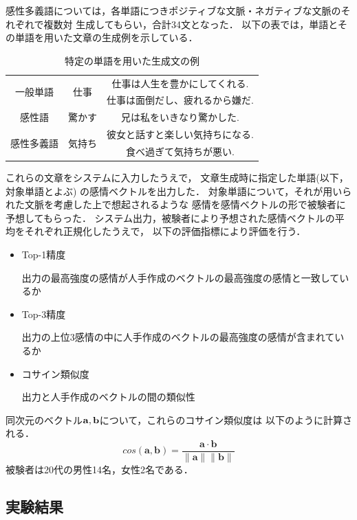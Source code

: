 		感性多義語については，各単語につきポジティブな文脈・ネガティブな文脈のそれぞれで複数対
		生成してもらい，合計34文となった．
		以下の表では，単語とその単語を用いた文章の生成例を示している．
		\begin{table}[H]
			\centering
			\caption{特定の単語を用いた生成文の例}
			\label{table:generated_sentences_sample}
			\begin{tabular}{|c|c|c|}
				\hline
				\multirow{2}{*}{一般単語} & \multirow{2}{*}{仕事} & 仕事は人生を豊かにしてくれる. \\
				\cline{3-3}
				& & 仕事は面倒だし、疲れるから嫌だ. \\
				\hline
				感性語 & 驚かす & 兄は私をいきなり驚かした. \\
				\hline
				\multirow{2}{*}{感性多義語} & \multirow{2}{*}{気持ち} & 彼女と話すと楽しい気持ちになる. \\
				\cline{3-3}
				& & 食べ過ぎて気持ちが悪い. \\
				\hline
			\end{tabular}
		\end{table}

		これらの文章をシステムに入力したうえで，
		文章生成時に指定した単語(以下，対象単語とよぶ)
		の感情ベクトルを出力した．
		対象単語について，それが用いられた文脈を考慮した上で想起されるような
		感情を感情ベクトルの形で被験者に予想してもらった．
		システム出力，被験者により予想された感情ベクトルの平均をそれぞれ正規化したうえで，
		以下の評価指標により評価を行う．
		\begin{itemize}
			\item Top-1精度
			\par 出力の最高強度の感情が人手作成のベクトルの最高強度の感情と一致しているか
			\item Top-3精度
			\par 出力の上位3感情の中に人手作成のベクトルの最高強度の感情が含まれているか
			\item コサイン類似度
			\par 出力と人手作成のベクトルの間の類似性
		\end{itemize}
		同次元のベクトル$\bold{a},\bold{b}$について，これらのコサイン類似度は
		以下のように計算される．
		\begin{equation}
			cos(\boldsymbol{a},\boldsymbol{b})=\frac{\boldsymbol{a}\cdot\boldsymbol{b}}{\|\boldsymbol{a}\|\|\boldsymbol{b}\|}
		\end{equation}
		被験者は20代の男性14名，女性2名である．

	\subsection{実験結果}
